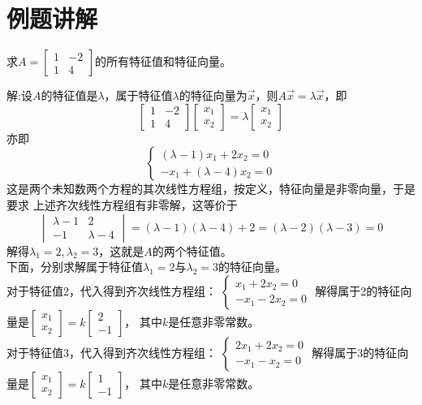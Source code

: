 \section{例题讲解}
\begin{eg}
求$A=\begin{bmatrix}1&-2\\1&4\end{bmatrix}$的所有特征值和特征向量。
\end{eg}
解:设$A$的特征值是$\lambda$，属于特征值$\lambda$的特征向量为$\vec{x}$，则$A\vec{x}=\lambda\vec{x}$，即
\begin{equation*}
\begin{bmatrix}1&-2\\1&4\end{bmatrix}\begin{bmatrix}x_1\\x_2\end{bmatrix}=
\lambda\begin{bmatrix}x_1\\x_2\end{bmatrix}
\end{equation*}
亦即
\begin{equation*}
\begin{cases}
(\lambda-1)x_1+2x_2=0\\
-x_1+(\lambda-4)x_2=0
\end{cases}
\end{equation*}
这是两个未知数两个方程的其次线性方程组，按定义，特征向量是非零向量，于是要求
上述齐次线性方程组有非零解，这等价于
\begin{equation*}
\begin{vmatrix}
\lambda-1&2\\-1&\lambda-4
\end{vmatrix}
=(\lambda-1)(\lambda-4)+2=(\lambda-2)(\lambda-3)=0
\end{equation*}
解得$\lambda_1=2,\lambda_2=3$，这就是$A$的两个特征值。\\
下面，分别求解属于特征值$\lambda_1=2$与$\lambda_2=3$的特征向量。\\
对于特征值2，代入得到齐次线性方程组：
$\begin{cases}x_1+2x_2=0\\-x_1-2x_2=0\end{cases}$
解得属于2的特征向量是$\begin{bmatrix}x_1\\x_2\end{bmatrix}=k\begin{bmatrix}2\\-1\end{bmatrix}$，
其中$k$是任意非零常数。\\
对于特征值3，代入得到齐次线性方程组：
$\begin{cases}2x_1+2x_2=0\\-x_1-x_2=0\end{cases}$
解得属于3的特征向量是$\begin{bmatrix}x_1\\x_2\end{bmatrix}=k\begin{bmatrix}1\\-1\end{bmatrix}$，
其中$k$是任意非零常数。

